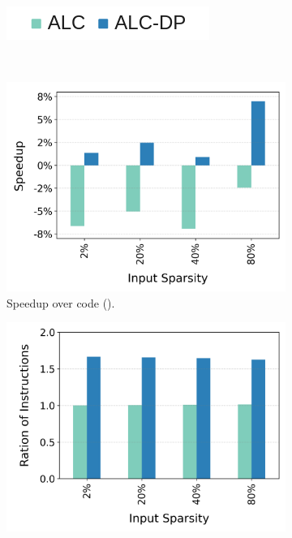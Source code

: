 \begin{figure}[t]
  \centering
  \begin{subfigure}{4cm}
    \centering
    \includegraphics[width=\textwidth]{Figures/Evaluations/Legend.png}
  \end{subfigure}\\
  \begin{subfigure}{.36\textwidth}
    \centering
    \includegraphics[width=\textwidth]{Figures/Evaluations/if_then_else_many_scatter_speedup.png}
    \caption{Speedup over \ifconverted code (\ifconv).}
     \label{fig:if-then-else-many-scatter-speedup}
  \end{subfigure}%
  \begin{subfigure}{.36\textwidth}
        \centering
    \includegraphics[width=\textwidth]{Figures/Evaluations/if_then_else_many_scatter_instr.png}

\end{subfigure}
\end{figure}
